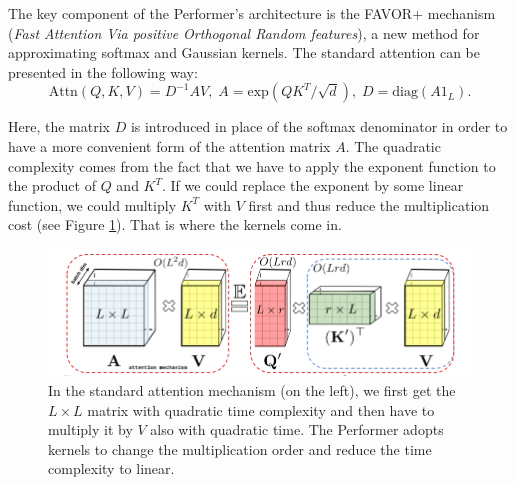 \documentclass[magisterska,en]{pracamgr}
\begin{document}
The key component of the Performer's architecture is the FAVOR+ mechanism (\textit{Fast Attention Via positive Orthogonal Random features}), a new method for approximating softmax and Gaussian kernels. The standard attention can be presented in the following way:
\begin{equation}
    \textrm{Attn}(Q, K, V) = D^{-1}AV, \; A=\textrm{exp}\left(QK^T/\sqrt{d}\right), \;
    D = \textrm{diag}\left(A1_{L}\right).
\label{attention_equation}\end{equation}

Here, the matrix $D$ is introduced in place of the softmax denominator in order to have a more convenient form of the attention matrix $A$. The quadratic complexity comes from the fact that we have to apply the exponent function to the product of $Q$ and $K^T$. If we could replace the exponent by some linear function, we could multiply $K^T$ with $V$ first and thus reduce the multiplication cost (see Figure \ref{performer_idea}). That is where the kernels come in.


\begin{figure}[H]
\centering
\includegraphics[scale=0.5]{./images/performer.png}
\caption{In the standard attention mechanism (on the left), we first get the $L\times L$ matrix with quadratic time complexity and then have to multiply it by $V$ also with quadratic time. The Performer adopts kernels to change the multiplication order and reduce the time complexity to linear.}
\label{performer_idea}
\end{figure}
\end{document}
